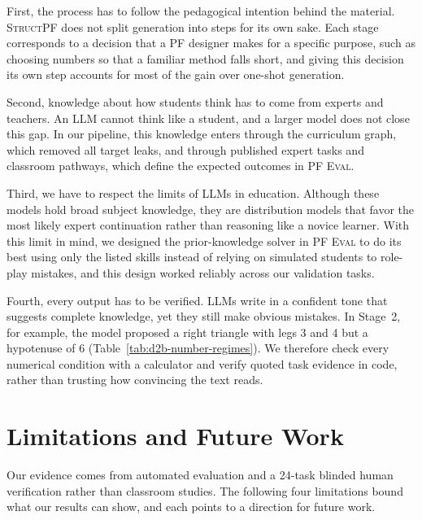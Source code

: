 First, the process has to follow the pedagogical intention behind the material. \textsc{StructPF} does not split generation into steps for its own sake. Each stage corresponds to a decision that a PF designer makes for a specific purpose, such as choosing numbers so that a familiar method falls short, and giving this decision its own step accounts for most of the gain over one-shot generation.

Second, knowledge about how students think has to come from experts and teachers. An LLM cannot think like a student, and a larger model does not close this gap. In our pipeline, this knowledge enters through the curriculum graph, which removed all target leaks, and through published expert tasks and classroom pathways, which define the expected outcomes in \textsc{PF Eval}.

Third, we have to respect the limits of LLMs in education. Although these models hold broad subject knowledge, they are distribution models that favor the most likely expert continuation rather than reasoning like a novice learner. With this limit in mind, we designed the prior-knowledge solver in \textsc{PF Eval} to do its best using only the listed skills instead of relying on simulated students to role-play mistakes, and this design worked reliably across our validation tasks.

Fourth, every output has to be verified. LLMs write in a confident tone that suggests complete knowledge, yet they still make obvious mistakes. In Stage~2, for example, the model proposed a right triangle with legs 3 and 4 but a hypotenuse of 6 (Table~\ref{tab:d2b-number-regimes}). We therefore check every numerical condition with a calculator and verify quoted task evidence in code, rather than trusting how convincing the text reads.

\section{Limitations and Future Work}
\label{sec:disc-limitations}

Our evidence comes from automated evaluation and a 24-task blinded human verification rather than classroom studies. The following four limitations bound what our results can show, and each points to a direction for future work.

